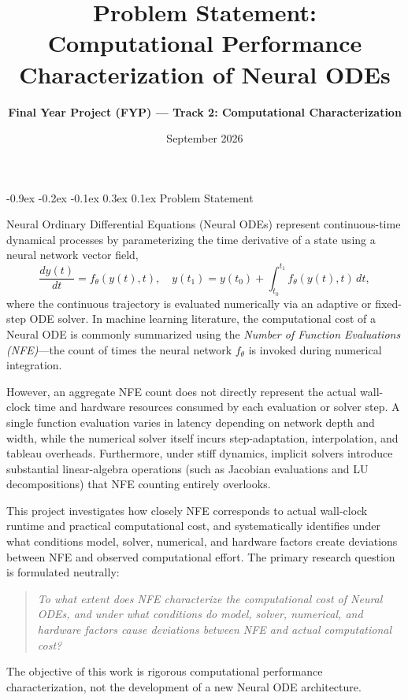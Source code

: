 \documentclass[10pt,a4paper]{article}
\title{\vspace{-2.2em}\textbf{\large Problem Statement: Computational Performance Characterization of Neural ODEs}\vspace{-0.6em}}
\author{\textbf{Final Year Project (FYP) --- Track 2: Computational Characterization}}
\date{\vspace{-0.6em}\footnotesize September 2026\vspace{-1.4em}}
\makeatletter
\renewcommand{\section}{\@startsection{section}{1}{\z@}%
  {-0.9ex \@plus -0.2ex \@minus -0.1ex}%
  {0.3ex \@plus 0.1ex}%
  {\normalfont\normalsize\bfseries}}
\makeatother
\begin{document}
\maketitle

\section{Problem Statement}

Neural Ordinary Differential Equations (Neural ODEs) represent continuous-time dynamical processes by parameterizing the time derivative of a state using a neural network vector field,
\begin{equation}
\frac{dy(t)}{dt} = f_\theta(y(t), t), \quad y(t_1) = y(t_0) + \int_{t_0}^{t_1} f_\theta(y(t), t) \, dt,
\end{equation}
where the continuous trajectory is evaluated numerically via an adaptive or fixed-step ODE solver. In machine learning literature, the computational cost of a Neural ODE is commonly summarized using the \emph{Number of Function Evaluations (NFE)}---the count of times the neural network $f_\theta$ is invoked during numerical integration. 

However, an aggregate NFE count does not directly represent the actual wall-clock time and hardware resources consumed by each evaluation or solver step. A single function evaluation varies in latency depending on network depth and width, while the numerical solver itself incurs step-adaptation, interpolation, and tableau overheads. Furthermore, under stiff dynamics, implicit solvers introduce substantial linear-algebra operations (such as Jacobian evaluations and LU decompositions) that NFE counting entirely overlooks.

This project investigates how closely NFE corresponds to actual wall-clock runtime and practical computational cost, and systematically identifies under what conditions model, solver, numerical, and hardware factors create deviations between NFE and observed computational effort. The primary research question is formulated neutrally:
\begin{quote}
\emph{To what extent does NFE characterize the computational cost of Neural ODEs, and under what conditions do model, solver, numerical, and hardware factors cause deviations between NFE and actual computational cost?}
\end{quote}
The objective of this work is rigorous computational performance characterization, not the development of a new Neural ODE architecture.
\end{document}

